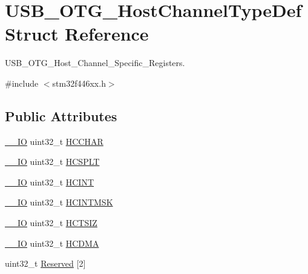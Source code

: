 \hypertarget{struct_u_s_b___o_t_g___host_channel_type_def}{}\section{U\+S\+B\+\_\+\+O\+T\+G\+\_\+\+Host\+Channel\+Type\+Def Struct Reference}
\label{struct_u_s_b___o_t_g___host_channel_type_def}


U\+S\+B\+\_\+\+O\+T\+G\+\_\+\+Host\+\_\+\+Channel\+\_\+\+Specific\+\_\+\+Registers.  




{\ttfamily \#include $<$stm32f446xx.\+h$>$}

\subsection*{Public Attributes}
\begin{DoxyCompactItemize}
\item 
\hyperlink{core__sc300_8h_aec43007d9998a0a0e01faede4133d6be}{\+\_\+\+\_\+\+IO} uint32\+\_\+t \hyperlink{struct_u_s_b___o_t_g___host_channel_type_def_a6f1e046a654010fb0da5eec942fb9a8d}{H\+C\+C\+H\+AR}
\item 
\hyperlink{core__sc300_8h_aec43007d9998a0a0e01faede4133d6be}{\+\_\+\+\_\+\+IO} uint32\+\_\+t \hyperlink{struct_u_s_b___o_t_g___host_channel_type_def_a23b3abb27cf5acff0edc709c90e2e5cb}{H\+C\+S\+P\+LT}
\item 
\hyperlink{core__sc300_8h_aec43007d9998a0a0e01faede4133d6be}{\+\_\+\+\_\+\+IO} uint32\+\_\+t \hyperlink{struct_u_s_b___o_t_g___host_channel_type_def_a6735bbd8fbc28f897f1b44df95f52873}{H\+C\+I\+NT}
\item 
\hyperlink{core__sc300_8h_aec43007d9998a0a0e01faede4133d6be}{\+\_\+\+\_\+\+IO} uint32\+\_\+t \hyperlink{struct_u_s_b___o_t_g___host_channel_type_def_a8edfae19390d323525449d2444e93984}{H\+C\+I\+N\+T\+M\+SK}
\item 
\hyperlink{core__sc300_8h_aec43007d9998a0a0e01faede4133d6be}{\+\_\+\+\_\+\+IO} uint32\+\_\+t \hyperlink{struct_u_s_b___o_t_g___host_channel_type_def_a14cb8c8dbbafdef182c82c0493ca48ab}{H\+C\+T\+S\+IZ}
\item 
\hyperlink{core__sc300_8h_aec43007d9998a0a0e01faede4133d6be}{\+\_\+\+\_\+\+IO} uint32\+\_\+t \hyperlink{struct_u_s_b___o_t_g___host_channel_type_def_a4204a2dcbc14fb11d371fc45b9f3170f}{H\+C\+D\+MA}
\item 
uint32\+\_\+t \hyperlink{struct_u_s_b___o_t_g___host_channel_type_def_aa85d014d19b79d61bed7fdf134ed1037}{Reserved} \mbox{[}2\mbox{]}
\end{DoxyCompactItemize}


